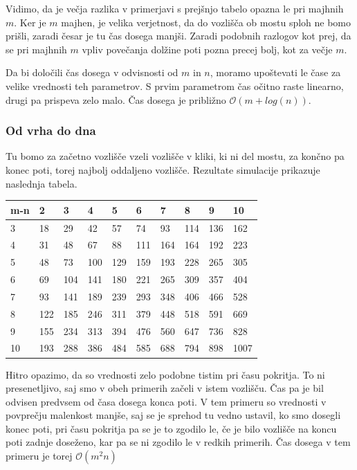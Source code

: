 \documentclass[12pt,a4paper]{amsart}
\begin{document}
Vidimo, da je večja razlika v primerjavi s prejšnjo tabelo opazna le pri majhnih $m$. Ker je $m$ majhen, je velika
verjetnost, da do vozlišča ob mostu sploh ne bomo prišli, zaradi česar je tu čas dosega manjši. Zaradi podobnih 
razlogov kot prej, da se pri majhnih $m$ vpliv povečanja dolžine poti pozna precej bolj, kot za večje $m$. 

Da bi določili čas dosega v odvisnosti od $m$ in $n$, moramo upoštevati le čase za velike vrednosti teh parametrov.
S prvim parametrom čas očitno raste linearno, drugi pa prispeva zelo malo. Čas dosega je približno
$\mathcal{O}(m+log(n))$.

\subsubsection{Od vrha do dna}

Tu bomo za začetno vozlišče vzeli vozlišče v kliki, ki ni del mostu, za končno pa konec poti, torej najbolj
oddaljeno vozlišče. Rezultate simulacije prikazuje naslednja tabela.

\begin{table}[!ht]
    \centering
    \begin{tabular}{|l|l|l|l|l|l|l|l|l|l|}
    \hline
        m-n & 2 & 3 & 4 & 5 & 6 & 7 & 8 & 9 & 10 \\ \hline
        3 & 18 & 29 & 42 & 57 & 74 & 93 & 114 & 136 & 162 \\ \hline
        4 & 31 & 48 & 67 & 88 & 111 & 164 & 164 & 192 & 223 \\ \hline
        5 & 48 & 73 & 100 & 129 & 159 & 193 & 228 & 265 & 305 \\ \hline
        6 & 69 & 104 & 141 & 180 & 221 & 265 & 309 & 357 & 404 \\ \hline
        7 & 93 & 141 & 189 & 239 & 293 & 348 & 406 & 466 & 528 \\ \hline
        8 & 122 & 185 & 246 & 311 & 379 & 448 & 518 & 591 & 669 \\ \hline
        9 & 155 & 234 & 313 & 394 & 476 & 560 & 647 & 736 & 828 \\ \hline
        10 & 193 & 288 & 386 & 484 & 585 & 688 & 794 & 898 & 1007 \\ \hline
    \end{tabular}
\end{table}

Hitro opazimo, da so vrednosti zelo podobne tistim pri času pokritja. To ni presenetljivo, saj smo v obeh primerih
začeli v istem vozlišču. Čas pa je bil odvisen predvsem od časa dosega konca poti. V tem primeru so vrednosti v 
povprečju malenkost manjše, saj se je sprehod tu vedno ustavil, ko smo dosegli konec poti, pri času pokritja pa 
se je to zgodilo le, če je bilo vozlišče na koncu poti zadnje doseženo, kar pa se ni zgodilo le v redkih primerih.
Čas dosega v tem primeru je torej $\mathcal{O}(m^2n)$
\end{document}
